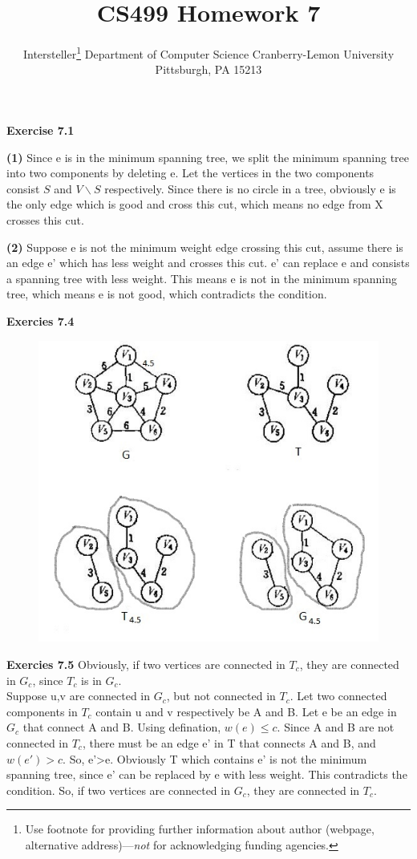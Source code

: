 \documentclass{article} %
\title{CS499 Homework 7}
\author{
	Intersteller\thanks{ Use footnote for providing further information
		about author (webpage, alternative address)---\emph{not} for acknowledging
		funding agencies.}
	Department of Computer Science
	Cranberry-Lemon University
	Pittsburgh, PA 15213
}
\begin{document}
	\maketitle
	\textbf{Exercise 7.1}\par
	\textbf{(1)}  Since e is in the minimum spanning tree, we split the minimum spanning tree into two components by deleting e. Let the vertices in the two components consist $S$ and $V\backslash S$ respectively. Since there is no circle in a tree, obviously e is the only edge which is good and cross this cut, which means no edge from X crosses this cut. \par
	\textbf{(2)}  Suppose e is not the minimum weight edge crossing this cut, assume there is an edge e' which has less weight and crosses this cut. e' can replace e and consists a spanning tree with less weight. This means e is not in the minimum spanning tree, which means e is not good, which contradicts the condition.\par
	\textbf{Exercies 7.4}
	\begin{figure}[H]
		\centering
		\includegraphics[scale=0.6]{P1.png}
		\caption{}
		\label{fig:1}
	\end{figure}

	\textbf{Exercies 7.5}
	Obviously, if two vertices are connected in $T_c$, they are connected in $G_c$, since $T_c$ is in $G_c$.\\
	Suppose u,v are connected in $G_c$, but not connected in $T_c$. Let two connected components in $T_c$ contain u and v respectively be A and B. Let e be an edge in $G_c$ that connect A and B. Using defination, $w(e)\leq c$. Since A and B are not connected in $T_c$, there must be an edge e' in T that connects A and B, and $w(e')>c$. So, e'>e. Obviously T which contains e' is not the minimum spanning tree, since e' can be replaced by e with less weight. This contradicts the condition. So, if two vertices are connected in $G_c$, they are connected in $T_c$.\par
\end{document}
